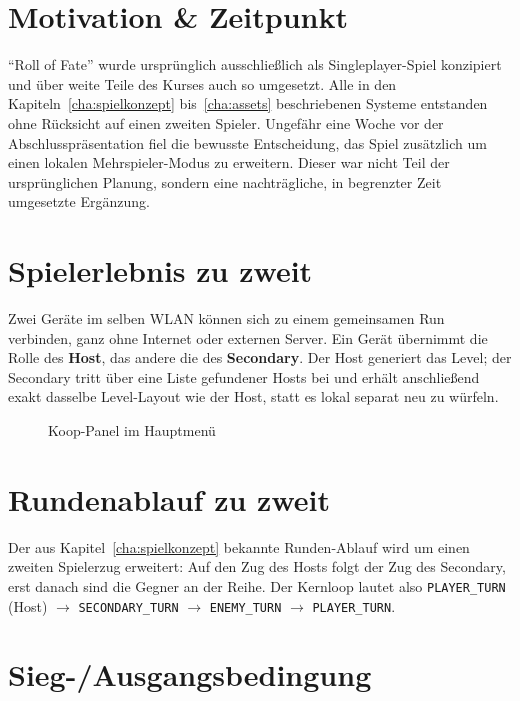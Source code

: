 \documentclass[oneside]{ausarbeitung}
\begin{document}
\section{Motivation \& Zeitpunkt}

\enquote{Roll of Fate} wurde ursprünglich ausschließlich als Singleplayer-Spiel konzipiert und über weite
Teile des Kurses auch so umgesetzt. Alle in den Kapiteln~\ref{cha:spielkonzept}
bis~\ref{cha:assets} beschriebenen Systeme entstanden ohne Rücksicht auf einen zweiten Spieler. Ungefähr eine Woche vor der Abschlusspräsentation fiel die bewusste Entscheidung, das Spiel zusätzlich um
einen lokalen Mehrspieler-Modus zu erweitern. Dieser war nicht Teil der ursprünglichen Planung,
sondern eine nachträgliche, in begrenzter Zeit umgesetzte Ergänzung.

\section{Spielerlebnis zu zweit}

Zwei Geräte im selben WLAN können sich zu einem gemeinsamen Run verbinden, ganz ohne Internet oder
externen Server. Ein Gerät übernimmt die Rolle des \textbf{Host}, das andere die des
\textbf{Secondary}. Der Host generiert das Level; der Secondary tritt über eine Liste gefundener
Hosts bei und erhält anschließend exakt dasselbe Level-Layout wie der Host, statt es lokal separat
neu zu würfeln.

\begin{figure}[h]
    \centering
    \caption{Koop-Panel im Hauptmenü}
    \label{fig:koop-panel}
\end{figure}

\section{Rundenablauf zu zweit}

Der aus Kapitel~\ref{cha:spielkonzept} bekannte Runden-Ablauf wird um einen zweiten Spielerzug
erweitert: Auf den Zug des Hosts folgt der Zug des Secondary, erst danach sind die Gegner an der
Reihe. Der Kernloop lautet also \texttt{PLAYER\_TURN} (Host) $\rightarrow$
\texttt{SECONDARY\_TURN} $\rightarrow$ \texttt{ENEMY\_TURN} $\rightarrow$ \texttt{PLAYER\_TURN}.

\section{Sieg-/Ausgangsbedingung}
\end{document}
